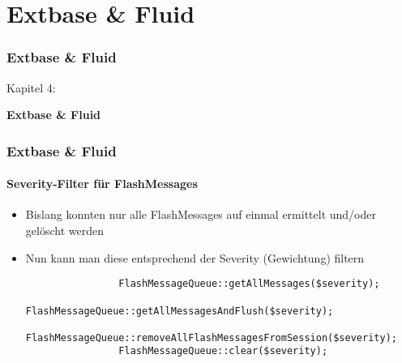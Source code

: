 %

\section{Extbase \& Fluid}
\begin{frame}[fragile]
	\frametitle{Extbase \& Fluid}

	\begin{center}\huge{Kapitel 4:}\end{center}
	\begin{center}\huge{\color{typo3darkgrey}\textbf{Extbase \& Fluid}}\end{center}

\end{frame}


\begin{frame}[fragile]
	\frametitle{Extbase \& Fluid}
	\framesubtitle{Severity-Filter für FlashMessages}

	\begin{itemize}

		\item Bislang konnten nur alle FlashMessages auf einmal ermittelt und/oder gelöscht werden
		\item Nun kann man diese entsprechend der Severity (Gewichtung) filtern

			\begin{lstlisting}
				FlashMessageQueue::getAllMessages($severity);
				FlashMessageQueue::getAllMessagesAndFlush($severity);
				FlashMessageQueue::removeAllFlashMessagesFromSession($severity);
				FlashMessageQueue::clear($severity);
			\end{lstlisting}

	\end{itemize}

\end{frame}

